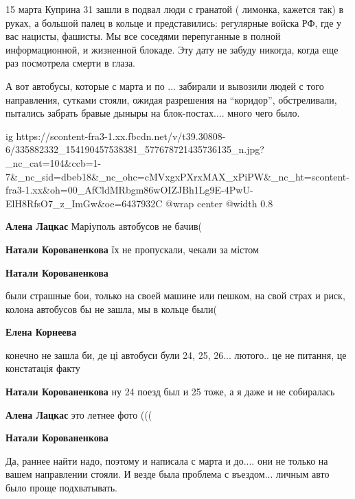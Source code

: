  
 
 
 
 

\qqSecCmt


15 марта Куприна 31 зашли в подвал люди с гранатой ( лимонка, кажется так) в
руках, а большой палец в кольце и представились: регулярные войска РФ, где у
вас нацисты, фашисты. Мы все соседями перепуганные в полной информационной, и
жизненной блокаде. Эту дату не забуду никогда, когда еще раз посмотрела смерти
в глаза.


А вот автобусы, которые с марта и по ... забирали и вывозили людей с того
направления, сутками стояли, ожидая разрешения на \enquote{коридор}, обстреливали,
пытались забрать бравые дыныры на блок-постах.... много чего было.

\ifcmt
  ig https://scontent-fra3-1.xx.fbcdn.net/v/t39.30808-6/335882332_154190457538381_577678721435736135_n.jpg?_nc_cat=104&ccb=1-7&_nc_sid=dbeb18&_nc_ohc=cMVxgxPXrxMAX_xPiPW&_nc_ht=scontent-fra3-1.xx&oh=00_AfCldMRbgm86wOIZJBh1Lg9E-4PwU-ElH8RfsO7_z_ImGw&oe=6437932C
  @wrap center
  @width 0.8
\fi

\begin{itemize} %
\textbf{Алена Лацкас} Маріуполь автобусов не бачив(

\textbf{Натали Корованенкова} їх не пропускали, чекали за містом

\textbf{Натали Корованенкова} 

были страшные бои, только на своей машине или пешком, на свой страх и риск,
колона автобусов бы не зашла, мы в кольце были(

\textbf{Елена Корнеева} 

конечно не зашла би, де ці автобуси були 24, 25, 26... лютого.. це не питання,
це констатація факту

\textbf{Натали Корованенкова} ну 24 поезд был и 25 тоже, а я даже и не собиралась

\textbf{Алена Лацкас} это летнее фото (((

\textbf{Натали Корованенкова} 

Да, раннее найти надо, поэтому и написала с марта и до.... они не только на
вашем направлении стояли. И везде была проблема с въездом... личным авто было
проще подхватывать.

\end{itemize} %

